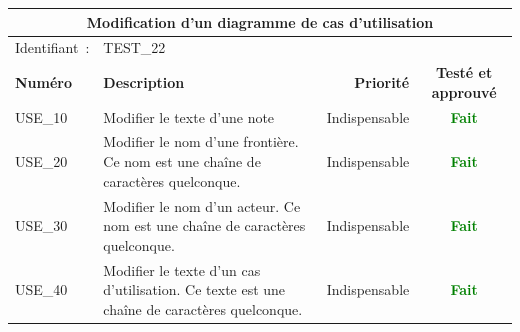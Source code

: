 \documentclass[hidelinks, a4paper,11pt,twoside,final]{article}
\begin{document}
    \begin{center}
    \begin{tabular}{|l|p{8cm}|r|c|}
        \hline\multicolumn{4}{|c|}{Modification d’un diagramme de cas d’utilisation} \\\hline
        {Identifiant~:} & \multicolumn{3}{|p{10cm}|}{TEST\_22} \\\hline
        {\textbf{Numéro}} & {\textbf{Description}} & {\textbf{Priorité}} & {\textbf{Testé et approuvé}}\\\hline
        {USE\_10} & {Modifier le texte d’une note} & {Indispensable} & {\textcolor{green}{\textbf{Fait}}}\\\hline
        {USE\_20} & {Modifier le nom d’une frontière. Ce nom est une chaîne de caractères quelconque.} & {Indispensable} & {\textcolor{green}{\textbf{Fait}}} \\\hline
        {USE\_30} & {Modifier le nom d’un acteur. Ce nom est une chaîne de caractères quelconque.} & {Indispensable} & {\textcolor{green}{\textbf{Fait}}} \\\hline
        {USE\_40} & {Modifier le texte d’un cas d’utilisation. Ce texte est une chaîne de caractères quelconque.} & {Indispensable} & {\textcolor{green}{\textbf{Fait}}} \\\hline
    \end{tabular}
\end{center}
\end{document}
